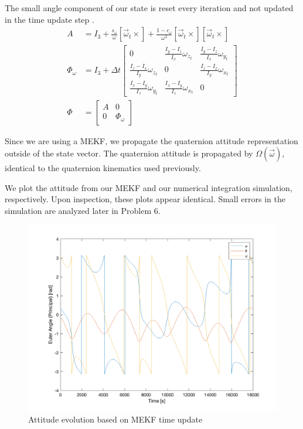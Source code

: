 The small angle component of our state is reset every iteration and not updated in the time update step \cite{CubeSatTelescope}.
\begin{align*}
    A &= I_{3} + \frac{s_{\omega}}{\omega} [\Vec{\omega}_{t} \times] + \frac{1 - c_{\omega}}{\omega^{2}} [\Vec{\omega}_{t} \times] [\Vec{\omega}_{t} \times] \\
    \Phi_{\omega} & = I_{3} + \Delta t \begin{bmatrix}
        0 & \frac{I_{y} - I_{z}}{I_x} \omega_{z_{t}} & \frac{I_{y} - I_{z}}{I_x} \omega_{y_{t}} \\
        \frac{I_{z} - I_{x}}{I_y} \omega_{z_{t}} & 0 & \frac{I_{z} - I_{x}}{I_y} \omega_{x_{t}} \\
        \frac{I_{x} - I_{y}}{I_z} \omega_{y_{t}} & \frac{I_{x} - I_{y}}{I_z} \omega_{x_{t}} & 0
    \end{bmatrix} \\
    \Phi &= \begin{bmatrix}
        A & 0 \\
        0 & \Phi_{\omega}
    \end{bmatrix}
\end{align*}

Since we are using a MEKF, we propagate the quaternion attitude representation outside of the state vector. The quaternion attitude is propagated by $\Omega (\Vec{\omega})$, identical to the quaternion kinematics used previously.

We plot the attitude from our MEKF and our numerical integration simulation, respectively. Upon inspection, these plots appear identical. Small errors in the simulation are analyzed later in Problem 6.

\begin{figure}[H]
\centering
\includegraphics[scale=0.6]{Images/ps7_problem5a_angle_est.png}
\caption{Attitude evolution based on MEKF time update}
\label{fig:ps7_problem5a_angle_est}
\end{figure}

